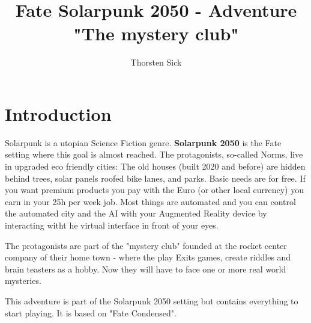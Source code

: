 \documentclass{book}
\title{Fate Solarpunk 2050 - Adventure "The mystery club"}
\author{Thorsten Sick}
\begin{document}
\chapter{Introduction}


Solarpunk is a utopian Science Fiction genre. \textbf{Solarpunk 2050} is the Fate setting where this goal is almost reached. The protagonists, so-called Norms, live in upgraded eco friendly cities: The old houses (built 2020 and before) are hidden behind trees, solar panels roofed bike lanes, and parks. Basic needs are for free. If you want premium products you pay with the Euro (or other local currency) you earn in your 25h per week job. Most things are automated and you can control the automated city and the AI with your Augmented Reality device by interacting witht he virtual interface in front of your eyes.

The protagonists are part of the "mystery club" founded at the rocket center company of their home town - where the play Exits games, create riddles and brain teasters as a hobby. Now they will have to face one or more real world mysteries.

This adventure is part of the Solarpunk 2050 setting but contains everything to start playing. It is based on "Fate Condensed".


\end{document}
